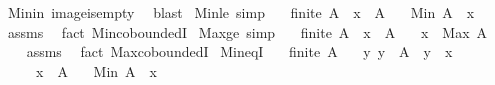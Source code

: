\begin{isabellebody}
%
\isadelimproof
%
\endisadelimproof
%
\isatagproof
{}\isamarkupfalse%
\ Min{\isacharunderscore}{\kern0pt}in\ image{\isacharunderscore}{\kern0pt}is{\isacharunderscore}{\kern0pt}empty\ \isamarkupfalse%
\ blast%
\endisatagproof
{\isafoldproof}%
%
\isadelimproof
\isanewline
%
\endisadelimproof
\isanewline
{}\isamarkupfalse%
\ Min{\isacharunderscore}{\kern0pt}le\ {\isacharbrackleft}{\kern0pt}simp{\isacharbrackright}{\kern0pt}{\isacharcolon}{\kern0pt}\isanewline
\ \ \ {\isachardoublequoteopen}finite\ A{\isachardoublequoteclose}\ \ {\isachardoublequoteopen}x\ {\isasymin}\ A{\isachardoublequoteclose}\isanewline
\ \ \ {\isachardoublequoteopen}Min\ A\ {\isasymle}\ x{\isachardoublequoteclose}\isanewline
%
\isadelimproof
\ \ %
\endisadelimproof
%
\isatagproof
{}\isamarkupfalse%
\ assms\ \isamarkupfalse%
\ {\isacharparenleft}{\kern0pt}fact\ Min{\isachardot}{\kern0pt}coboundedI{\isacharparenright}{\kern0pt}%
\endisatagproof
{\isafoldproof}%
%
\isadelimproof
\isanewline
%
\endisadelimproof
\isanewline
{}\isamarkupfalse%
\ Max{\isacharunderscore}{\kern0pt}ge\ {\isacharbrackleft}{\kern0pt}simp{\isacharbrackright}{\kern0pt}{\isacharcolon}{\kern0pt}\isanewline
\ \ \ {\isachardoublequoteopen}finite\ A{\isachardoublequoteclose}\ \ {\isachardoublequoteopen}x\ {\isasymin}\ A{\isachardoublequoteclose}\isanewline
\ \ \ {\isachardoublequoteopen}x\ {\isasymle}\ Max\ A{\isachardoublequoteclose}\isanewline
%
\isadelimproof
\ \ %
\endisadelimproof
%
\isatagproof
{}\isamarkupfalse%
\ assms\ \isamarkupfalse%
\ {\isacharparenleft}{\kern0pt}fact\ Max{\isachardot}{\kern0pt}coboundedI{\isacharparenright}{\kern0pt}%
\endisatagproof
{\isafoldproof}%
%
\isadelimproof
\isanewline
%
\endisadelimproof
\isanewline
{}\isamarkupfalse%
\ Min{\isacharunderscore}{\kern0pt}eqI{\isacharcolon}{\kern0pt}\isanewline
\ \ \ {\isachardoublequoteopen}finite\ A{\isachardoublequoteclose}\isanewline
\ \ \ {\isachardoublequoteopen}{\isasymAnd}y{\isachardot}{\kern0pt}\ y\ {\isasymin}\ A\ {\isasymLongrightarrow}\ y\ {\isasymge}\ x{\isachardoublequoteclose}\isanewline
\ \ \ \ \ {\isachardoublequoteopen}x\ {\isasymin}\ A{\isachardoublequoteclose}\isanewline
\ \ \ {\isachardoublequoteopen}Min\ A\ {\isacharequal}{\kern0pt}\ x{\isachardoublequoteclose}\isanewline
%
\isadelimproof
%
\endisadelimproof
%
\isatagproof

\end{isabellebody}
